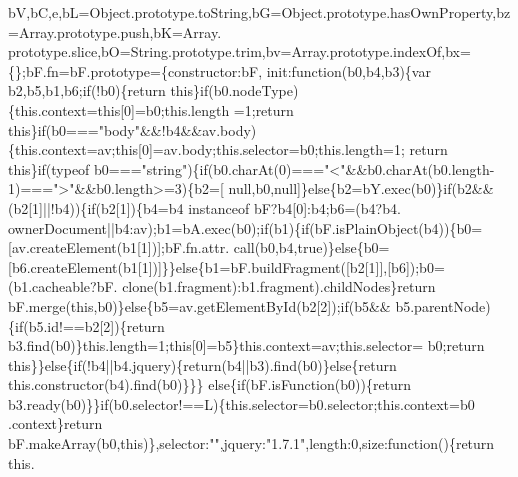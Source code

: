 \begin{DoxyCode}
      bV,bC,e,bL=Object.prototype.toString,bG=Object.prototype.hasOwnProperty,bz=Array.prototype.push,bK=Array.
      prototype.slice,bO=String.prototype.trim,bv=Array.prototype.indexOf,bx=\{\};bF.fn=bF.prototype=\{constructor:bF,
      init:\textcolor{keyword}{function}(b0,b4,b3)\{var b2,b5,b1,b6;\textcolor{keywordflow}{if}(!b0)\{\textcolor{keywordflow}{return} \textcolor{keyword}{this}\}\textcolor{keywordflow}{if}(b0.nodeType)\{this.context=\textcolor{keyword}{this}[0]=b0;this.length
      =1;\textcolor{keywordflow}{return} \textcolor{keyword}{this}\}\textcolor{keywordflow}{if}(b0===\textcolor{stringliteral}{"body"}&&!b4&&av.body)\{this.context=av;\textcolor{keyword}{this}[0]=av.body;this.selector=b0;this.length=1;\textcolor{keywordflow}{
      return} \textcolor{keyword}{this}\}\textcolor{keywordflow}{if}(typeof b0===\textcolor{stringliteral}{"string"})\{\textcolor{keywordflow}{if}(b0.charAt(0)===\textcolor{stringliteral}{"<"}&&b0.charAt(b0.length-1)===\textcolor{stringliteral}{">"}&&b0.length>=3)\{b2=[
      null,b0,null]\}\textcolor{keywordflow}{else}\{b2=bY.exec(b0)\}\textcolor{keywordflow}{if}(b2&&(b2[1]||!b4))\{\textcolor{keywordflow}{if}(b2[1])\{b4=b4 instanceof bF?b4[0]:b4;b6=(b4?b4.
      ownerDocument||b4:av);b1=bA.exec(b0);\textcolor{keywordflow}{if}(b1)\{\textcolor{keywordflow}{if}(bF.isPlainObject(b4))\{b0=[av.createElement(b1[1])];bF.fn.attr.
      call(b0,b4,\textcolor{keyword}{true})\}\textcolor{keywordflow}{else}\{b0=[b6.createElement(b1[1])]\}\}\textcolor{keywordflow}{else}\{b1=bF.buildFragment([b2[1]],[b6]);b0=(b1.cacheable?bF.
      clone(b1.fragment):b1.fragment).childNodes\}\textcolor{keywordflow}{return} bF.merge(\textcolor{keyword}{this},b0)\}\textcolor{keywordflow}{else}\{b5=av.getElementById(b2[2]);\textcolor{keywordflow}{if}(b5&&
      b5.parentNode)\{\textcolor{keywordflow}{if}(b5.id!==b2[2])\{\textcolor{keywordflow}{return} b3.find(b0)\}this.length=1;\textcolor{keyword}{this}[0]=b5\}this.context=av;this.selector=
      b0;\textcolor{keywordflow}{return} \textcolor{keyword}{this}\}\}\textcolor{keywordflow}{else}\{\textcolor{keywordflow}{if}(!b4||b4.jquery)\{\textcolor{keywordflow}{return}(b4||b3).find(b0)\}\textcolor{keywordflow}{else}\{\textcolor{keywordflow}{return} this.constructor(b4).find(b0)\}\}\}\textcolor{keywordflow}{
      else}\{\textcolor{keywordflow}{if}(bF.isFunction(b0))\{\textcolor{keywordflow}{return} b3.ready(b0)\}\}\textcolor{keywordflow}{if}(b0.selector!==L)\{this.selector=b0.selector;this.context=b0
      .context\}\textcolor{keywordflow}{return} bF.makeArray(b0,\textcolor{keyword}{this})\},selector:\textcolor{stringliteral}{""},jquery:\textcolor{stringliteral}{"1.7.1"},length:0,size:\textcolor{keyword}{function}()\{\textcolor{keywordflow}{return} this.

\end{DoxyCode}
